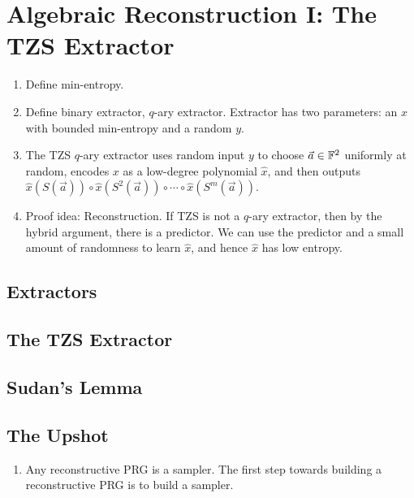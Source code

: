\chapter{Algebraic Reconstruction I: The TZS Extractor}

\begin{enumerate}
  \item Define min-entropy.
  \item Define binary extractor, $q$-ary extractor. Extractor has two parameters: an $x$ with bounded min-entropy and a random $y$.
  \item The TZS $q$-ary extractor uses random input $y$ to choose $\vec{a} \in \mathbb{F}^2$ uniformly at random, encodes $x$ as a low-degree polynomial $\hat{x}$, and then outputs $\hat{x}(S(\vec{a})) \circ \hat{x}(S^2(\vec{a})) \circ \cdots \circ \hat{x}(S^m(\vec{a}))$.
  \item Proof idea: Reconstruction. If TZS is not a $q$-ary extractor, then by the hybrid argument, there is a predictor. We can use the predictor and a small amount of randomness to learn $\hat{x}$, and hence $\hat{x}$ has low entropy.
\end{enumerate}

\section{Extractors}

\section{The TZS Extractor}

\section{Sudan's Lemma}

\section*{The Upshot}

\begin{enumerate}
  \item Any reconstructive PRG is a sampler. The first step towards building a
    reconstructive PRG is to build a sampler.
\end{enumerate}
